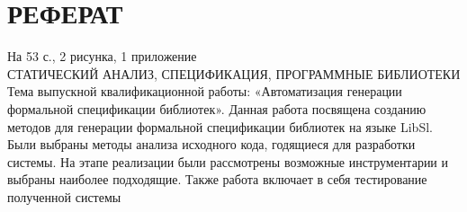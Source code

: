 \chapter*{РЕФЕРАТ}
\thispagestyle{empty}

На 53 с., 2 рисунка, 1 приложение \\

СТАТИЧЕСКИЙ АНАЛИЗ, СПЕЦИФИКАЦИЯ, ПРОГРАММНЫЕ БИБЛИОТЕКИ \\

Тема выпускной квалификационной работы: «Автоматизация генерации формальной спецификации библиотек».
Данная работа посвящена созданию методов для генерации формальной спецификации библиотек на языке LibSl.
Были выбраны методы анализа исходного кода, годящиеся для разработки системы.
На этапе реализации были рассмотрены возможные инструментарии и выбраны наиболее подходящие.
Также работа включает в себя тестирование полученной системы